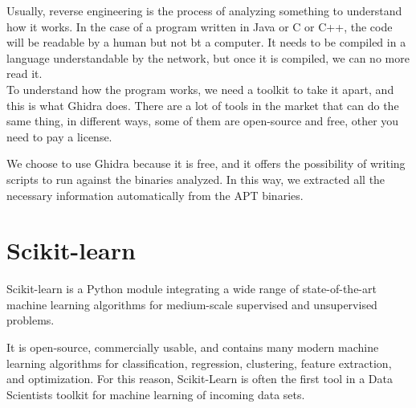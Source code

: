 Usually, reverse engineering is the process of analyzing something to understand how it works. In the case of a program written in Java or C or C++, the code will be readable by a human but not bt a computer. It needs to be compiled in a language understandable by the network, but once it is compiled, we can no more read it. \\

To understand how the program works, we need a toolkit to take it apart, and this is what Ghidra does. There are a lot of tools in the market that can do the same thing, in different ways, some of them are open-source and free, other you need to pay a license. 

We choose to use Ghidra because it is free, and it offers the possibility of writing scripts to run against the binaries analyzed. In this way, we extracted all the necessary information automatically from the APT binaries.
\section{Scikit-learn}

Scikit-learn is a Python module integrating a wide range of state-of-the-art machine learning algorithms for medium-scale supervised and unsupervised problems. 

It is open-source, commercially usable, and contains many modern machine learning algorithms for classification, regression, clustering, feature extraction, and optimization.
For this reason, Scikit-Learn is often the first tool in a Data Scientists toolkit for machine learning of incoming data sets. \cite{scikit-learn}
